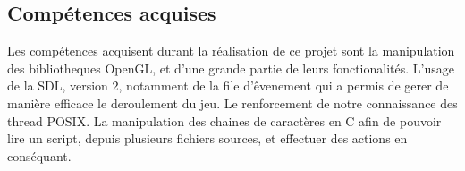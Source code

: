 \subsection{Compétences acquises}
	Les compétences acquisent durant la réalisation de ce projet sont la manipulation des bibliotheques OpenGL, et d'une grande partie de leurs fonctionalités.
	L'usage de la SDL, version 2, notamment de la file d'êvenement qui a permis de gerer de manière efficace le deroulement du jeu.
	Le renforcement de notre connaissance des thread POSIX.
	La manipulation des chaines de caractères en C afin de pouvoir lire un script, depuis plusieurs fichiers sources, et effectuer des actions en conséquant.